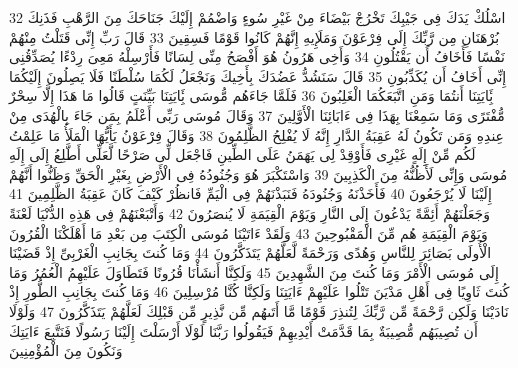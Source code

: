 \documentclass[20pt,a4paper]{article}
\begin{document}
{\tiny\colorbox{cl_aya}{32}} اسْلُكْ يَدَكَ فِى جَيْبِكَ تَخْرُجْ بَيْضَاءَ مِنْ غَيْرِ سُوءٍ وَاضْمُمْ إِلَيْكَ جَنَاحَكَ مِنَ الرَّهْبِ فَذَنِكَ بُرْهَنَانِ مِن رَّبِّكَ إِلَى فِرْعَوْنَ وَمَلَإِيهِ إِنَّهُمْ كَانُوا قَوْمًا فَسِقِينَ
{\tiny\colorbox{cl_aya}{33}} قَالَ رَبِّ إِنِّى قَتَلْتُ مِنْهُمْ نَفْسًا فَأَخَافُ أَن يَقْتُلُونِ
{\tiny\colorbox{cl_aya}{34}} وَأَخِى هَرُونُ هُوَ أَفْصَحُ مِنِّى لِسَانًا فَأَرْسِلْهُ مَعِىَ رِدْءًا يُصَدِّقُنِى إِنِّى أَخَافُ أَن يُكَذِّبُونِ
{\tiny\colorbox{cl_aya}{35}} قَالَ سَنَشُدُّ عَضُدَكَ بِأَخِيكَ وَنَجْعَلُ لَكُمَا سُلْطَنًا فَلَا يَصِلُونَ إِلَيْكُمَا بَِٔايَتِنَا أَنتُمَا وَمَنِ اتَّبَعَكُمَا الْغَلِبُونَ
{\tiny\colorbox{cl_aya}{36}} فَلَمَّا جَاءَهُم مُّوسَى بَِٔايَتِنَا بَيِّنَتٍ قَالُوا مَا هَذَا إِلَّا سِحْرٌ مُّفْتَرًى وَمَا سَمِعْنَا بِهَذَا فِى ءَابَائِنَا الْأَوَّلِينَ
{\tiny\colorbox{cl_aya}{37}} وَقَالَ مُوسَى رَبِّى أَعْلَمُ بِمَن جَاءَ بِالْهُدَى مِنْ عِندِهِ وَمَن تَكُونُ لَهُ عَقِبَةُ الدَّارِ إِنَّهُ لَا يُفْلِحُ الظَّلِمُونَ
{\tiny\colorbox{cl_aya}{38}} وَقَالَ فِرْعَوْنُ يَأَيُّهَا الْمَلَأُ مَا عَلِمْتُ لَكُم مِّنْ إِلَهٍ غَيْرِى فَأَوْقِدْ لِى يَهَمَنُ عَلَى الطِّينِ فَاجْعَل لِّى صَرْحًا لَّعَلِّى أَطَّلِعُ إِلَى إِلَهِ مُوسَى وَإِنِّى لَأَظُنُّهُ مِنَ الْكَذِبِينَ
{\tiny\colorbox{cl_aya}{39}} وَاسْتَكْبَرَ هُوَ وَجُنُودُهُ فِى الْأَرْضِ بِغَيْرِ الْحَقِّ وَظَنُّوا أَنَّهُمْ إِلَيْنَا لَا يُرْجَعُونَ
{\tiny\colorbox{cl_aya}{40}} فَأَخَذْنَهُ وَجُنُودَهُ فَنَبَذْنَهُمْ فِى الْيَمِّ فَانظُرْ كَيْفَ كَانَ عَقِبَةُ الظَّلِمِينَ
{\tiny\colorbox{cl_aya}{41}} وَجَعَلْنَهُمْ أَئِمَّةً يَدْعُونَ إِلَى النَّارِ وَيَوْمَ الْقِيَمَةِ لَا يُنصَرُونَ
{\tiny\colorbox{cl_aya}{42}} وَأَتْبَعْنَهُمْ فِى هَذِهِ الدُّنْيَا لَعْنَةً وَيَوْمَ الْقِيَمَةِ هُم مِّنَ الْمَقْبُوحِينَ
{\tiny\colorbox{cl_aya}{43}} وَلَقَدْ ءَاتَيْنَا مُوسَى الْكِتَبَ مِن بَعْدِ مَا أَهْلَكْنَا الْقُرُونَ الْأُولَى بَصَائِرَ لِلنَّاسِ وَهُدًى وَرَحْمَةً لَّعَلَّهُمْ يَتَذَكَّرُونَ
{\tiny\colorbox{cl_aya}{44}} وَمَا كُنتَ بِجَانِبِ الْغَرْبِىِّ إِذْ قَضَيْنَا إِلَى مُوسَى الْأَمْرَ وَمَا كُنتَ مِنَ الشَّهِدِينَ
{\tiny\colorbox{cl_aya}{45}} وَلَكِنَّا أَنشَأْنَا قُرُونًا فَتَطَاوَلَ عَلَيْهِمُ الْعُمُرُ وَمَا كُنتَ ثَاوِيًا فِى أَهْلِ مَدْيَنَ تَتْلُوا عَلَيْهِمْ ءَايَتِنَا وَلَكِنَّا كُنَّا مُرْسِلِينَ
{\tiny\colorbox{cl_aya}{46}} وَمَا كُنتَ بِجَانِبِ الطُّورِ إِذْ نَادَيْنَا وَلَكِن رَّحْمَةً مِّن رَّبِّكَ لِتُنذِرَ قَوْمًا مَّا أَتَىهُم مِّن نَّذِيرٍ مِّن قَبْلِكَ لَعَلَّهُمْ يَتَذَكَّرُونَ
{\tiny\colorbox{cl_aya}{47}} وَلَوْلَا أَن تُصِيبَهُم مُّصِيبَةٌ بِمَا قَدَّمَتْ أَيْدِيهِمْ فَيَقُولُوا رَبَّنَا لَوْلَا أَرْسَلْتَ إِلَيْنَا رَسُولًا فَنَتَّبِعَ ءَايَتِكَ وَنَكُونَ مِنَ الْمُؤْمِنِينَ
\end{document}
